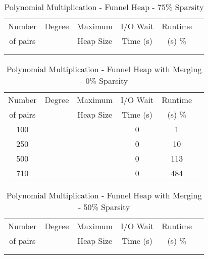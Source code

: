 \documentclass[11pt, one-sided]{amsart}
\begin{document}
\begin{table}[htbp]
   \centering
      \caption{Polynomial Multiplication - Funnel Heap - 75\% Sparsity}
   \begin{tabular}{|c|c|c|c|c|c|}
   	\hline
		 Number   & 	Degree	& Maximum & I/O Wait		& Runtime 	 \\ 
		 of pairs 	&			& Heap Size	& Time (s)		&	(s)		 		\%				\\ \hline
		 		&			&			&			&						\\
		 		&			&			&			&						\\
   \end{tabular}
   \label{tab:booktabs}
\end{table}



\newpage


\begin{table}[htbp]
   \centering
      \caption{Polynomial Multiplication - Funnel Heap with Merging - 0\% Sparsity}
   \begin{tabular}{|c|c|c|c|c|c|}
   	\hline
		 Number   & 	Degree	& Maximum & I/O Wait		&  Runtime  \\ 
		 of pairs 	&			& Heap Size	& Time (s)		&	(s)	 		\%				\\ \hline
		 100		&			&			&	0		&	1					\\
		 250		&			&			&	0		&	10					\\
		 500		&			&			&	0		&	113					\\
		 710		&			&			&	0		&	484					\\
	\hline				
   \end{tabular}
   \label{tab:booktabs}
\end{table}

\begin{table}[htbp]
   \centering
      \caption{Polynomial Multiplication - Funnel Heap with Merging - 50\% Sparsity}
   \begin{tabular}{|c|c|c|c|c|c|}
   	\hline
		 Number   & 	Degree	& Maximum & 	I/O Wait	&  Runtime 	 \\ 
		 of pairs 	&			& Heap Size	& 	Time (s)		&	(s)	 		\%				\\ \hline
		 		&			&			&			&						\\
		 		&			&			&			&						\\
   \end{tabular}
   \label{tab:booktabs}
\end{table}
\end{document}
